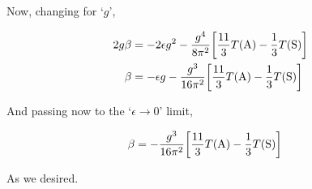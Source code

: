 Now, changing for `$g$',

\begin{align}
    2g\beta&=-2\epsilon g^2 -\frac{g^4}{8\pi^2}\qty[\frac{11}{3}T\qty(\textnormal{A})-\frac13T\qty(\textnormal{S})]\nonumber\\
    \beta&=-\epsilon g -\frac{g^3}{16\pi^2}\qty[\frac{11}{3}T\qty(\textnormal{A})-\frac13T\qty(\textnormal{S})]\nonumber
\end{align}

And passing now to the `$\epsilon\rightarrow 0$' limit,

\begin{align}
    \beta&= -\frac{g^3}{16\pi^2}\qty[\frac{11}{3}T\qty(\textnormal{A})-\frac13T\qty(\textnormal{S})]\nonumber
\end{align}

As we desired.
